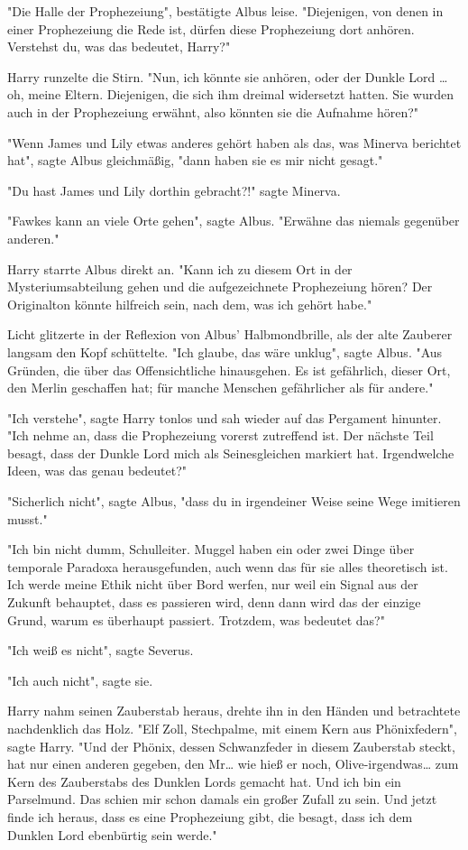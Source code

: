 {"Die Halle der Prophezeiung", bestätigte Albus leise. "Diejenigen, von denen in einer Prophezeiung die Rede ist, dürfen diese Prophezeiung dort anhören. Verstehst du, was das bedeutet, Harry?"

Harry runzelte die Stirn. "Nun, ich könnte sie anhören, oder der Dunkle Lord … oh, meine Eltern. Diejenigen, die sich ihm dreimal widersetzt hatten. Sie wurden auch in der Prophezeiung erwähnt, also könnten sie die Aufnahme hören?"

"Wenn James und Lily etwas anderes gehört haben als das, was Minerva berichtet hat", sagte Albus gleichmäßig, "dann haben sie es mir nicht gesagt."

"Du hast James und Lily dorthin gebracht?!" sagte Minerva.

"Fawkes kann an viele Orte gehen", sagte Albus. "Erwähne das niemals gegenüber anderen."

Harry starrte Albus direkt an. "Kann ich zu diesem Ort in der Mysteriumsabteilung gehen und die aufgezeichnete Prophezeiung hören? Der Originalton könnte hilfreich sein, nach dem, was ich gehört habe."

Licht glitzerte in der Reflexion von Albus' Halbmondbrille, als der alte Zauberer langsam den Kopf schüttelte. "Ich glaube, das wäre unklug", sagte Albus. "Aus Gründen, die über das Offensichtliche hinausgehen. Es ist gefährlich, dieser Ort, den Merlin geschaffen hat; für manche Menschen gefährlicher als für andere."

"Ich verstehe", sagte Harry tonlos und sah wieder auf das Pergament hinunter. "Ich nehme an, dass die Prophezeiung vorerst zutreffend ist. Der nächste Teil besagt, dass der Dunkle Lord mich als Seinesgleichen markiert hat. Irgendwelche Ideen, was das genau bedeutet?"

"Sicherlich nicht", sagte Albus, "dass du in irgendeiner Weise seine Wege imitieren musst."

"Ich bin nicht dumm, Schulleiter. Muggel haben ein oder zwei Dinge über temporale Paradoxa herausgefunden, auch wenn das für sie alles theoretisch ist. Ich werde meine Ethik nicht über Bord werfen, nur weil ein Signal aus der Zukunft behauptet, dass es passieren wird, denn dann wird das der einzige Grund, warum es überhaupt passiert. Trotzdem, was bedeutet das?"

"Ich weiß es nicht", sagte Severus.

"Ich auch nicht", sagte sie.

Harry nahm seinen Zauberstab heraus, drehte ihn in den Händen und betrachtete nachdenklich das Holz. "Elf Zoll, Stechpalme, mit einem Kern aus Phönixfedern", sagte Harry. "Und der Phönix, dessen Schwanzfeder in diesem Zauberstab steckt, hat nur einen anderen gegeben, den Mr… wie hieß er noch, Olive-irgendwas… zum Kern des Zauberstabs des Dunklen Lords gemacht hat. Und ich bin ein Parselmund. Das schien mir schon damals ein großer Zufall zu sein. Und jetzt finde ich heraus, dass es eine Prophezeiung gibt, die besagt, dass ich dem Dunklen Lord ebenbürtig sein werde."

}

